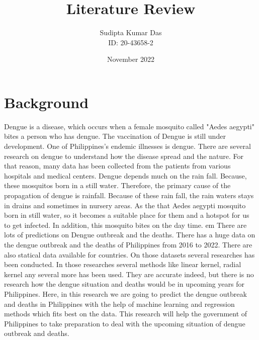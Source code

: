 \documentclass{article}
\title{Literature Review }
\author{Sudipta Kumar Das\\ID: 20-43658-2}
\date{November 2022}
\begin{document}
\maketitle

\section{Background}
Dengue is a disease, which occurs when a female mosquito called "Aedes aegypti" bites a person who has dengue. The vaccination of Dengue is still under development. One of Philippines's
endemic illnesses is dengue. There are several research on dengue to understand how the disease spread and the nature. For that reason, many data has been collected from the patients from
various hospitals and medical centers. Dengue depends much on the rain fall. Because, these mosquitos born in a still water. Therefore, the primary cause of the propagation of dengue is
rainfall. Because of these rain fall, the rain waters stays in drains and sometimes in nursery areas. As the that Aedes aegypti mosquito born in still water, so it becomes a suitable place
for them and a hotspot for us to get infected. In addition, this mosquito bites on the day time.
    { em}
There are lots of predictions on Dengue outbreak and the deaths. There has a huge data on the dengue outbreak and the deaths of Philippines from 2016 to 2022. There are also
statical data available for countries. On those datasets several researches has been conducted. In those researches several methods like linear kernel, radial kernel any several more
has been used. They are accurate indeed,
but there is no research how the dengue situation and deaths would be in upcoming years for Philippines. Here, in this research we are going to predict the dengue outbreak and deaths in Philippines with
the help of machine learning and regression methods which fits best on the data. This research will help the government of Philippines to take preparation to deal with the upcoming situation of
dengue outbreak and deaths.
\end{document}
